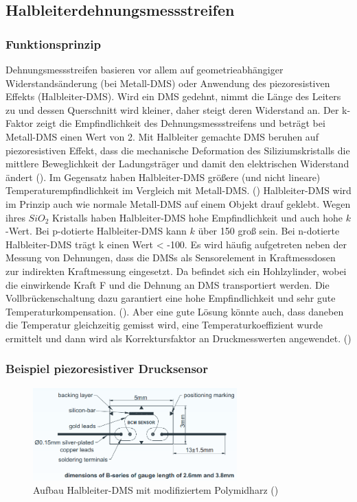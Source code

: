 \documentclass[12pt]{article}
\begin{document}
\subsection{Halbleiterdehnungsmessstreifen}
\subsubsection{Funktionsprinzip}
Dehnungsmessstreifen basieren vor allem auf geometrieabhängiger Widerstandsänderung (bei Metall-DMS) oder Anwendung des piezoresistiven Effekts (Halbleiter-DMS). Wird ein DMS gedehnt, nimmt die Länge des Leiters zu und dessen Querschnitt wird kleiner, daher steigt deren Widerstand an. Der k-Faktor zeigt die Empfindlichkeit des Dehnungsmessstreifens und beträgt bei Metall-DMS einen Wert von 2. Mit Halbleiter gemachte DMS beruhen auf piezoresistiven Effekt, dass die mechanische Deformation des Siliziumskristalls die mittlere Beweglichkeit der Ladungsträger und damit den elektrischen Widerstand ändert (\cite{Buttgenbach.2016}). Im Gegensatz haben Halbleiter-DMS größere (und nicht lineare) Temperaturempfindlichkeit im Vergleich mit Metall-DMS. (\cite{Heimann.}) Halbleiter-DMS wird im Prinzip auch  wie normale Metall-DMS auf einem Objekt drauf geklebt. Wegen ihres $SiO_2$ Kristalls haben Halbleiter-DMS hohe Empfindlichkeit und auch hohe $k$-Wert. Bei p-dotierte Halbleiter-DMS kann $k$ über 150 groß sein. Bei n-dotierte Halbleiter-DMS trägt k einen Wert < -100. 
Es wird häufig aufgetreten neben der Messung von Dehnungen, dass die DMSs als Sensorelement in Kraftmessdosen zur indirekten Kraftmessung eingesetzt. Da befindet sich ein Hohlzylinder, wobei die einwirkende Kraft F und die Dehnung an DMS transportiert werden. Die Vollbrückenschaltung dazu garantiert eine hohe Empfindlichkeit und sehr gute Temperaturkompensation. (\cite{Parthier.2006}). Aber eine gute Lösung könnte auch, dass daneben die Temperatur gleichzeitig gemisst wird, eine Temperaturkoeffizient wurde ermittelt und dann wird als Korrektursfaktor an Druckmesswerten angewendet. (\cite{Siemens.2021})

\subsubsection{Beispiel piezoresistiver Drucksensor}
\begin{figure}[h]
  \centering
  \label{fig:bcmsensor}
  \includegraphics[width=0.7\textwidth]{halbleiterdms}
  \caption{Aufbau Halbleiter-DMS mit modifiziertem Polymidharz (\cite{Wu.1992})}
\end{figure}
\end{document}
